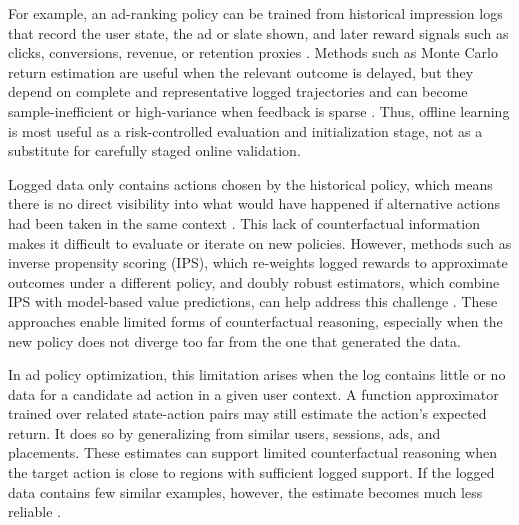 \documentclass[manuscript,review,screen]{acmart}
\begin{document}
For example, an ad-ranking policy can be trained from historical impression logs that record the user state, the ad or slate shown, and later reward signals such as clicks, conversions, revenue, or retention proxies \cite{chen2022off, zhao2021dear, swaminathan2015counterfactual}. Methods such as Monte Carlo return estimation are useful when the relevant outcome is delayed, but they depend on complete and representative logged trajectories and can become sample-inefficient or high-variance when feedback is sparse \cite{Sutton1998, levine2020offline, dulac2021challenges}. Thus, offline learning is most useful as a risk-controlled evaluation and initialization stage, not as a substitute for carefully staged online validation.

Logged data only contains actions chosen by the historical policy, which means there is no direct visibility into what would have happened if alternative actions had been taken in the same context \cite{swaminathan2015counterfactual}. This lack of counterfactual information makes it difficult to evaluate or iterate on new policies. However, methods such as inverse propensity scoring (IPS), which re-weights logged rewards to approximate outcomes under a different policy, and doubly robust estimators, which combine IPS with model-based value predictions, can help address this challenge \cite{swaminathan2015counterfactual, dudik2011doubly, levine2020offline}. These approaches enable limited forms of counterfactual reasoning, especially when the new policy does not diverge too far from the one that generated the data.

 In ad policy optimization, this limitation arises when the log contains little or no data for a candidate ad action in a given user context. A function approximator trained over related state-action pairs may still estimate the action's expected return. It does so by generalizing from similar users, sessions, ads, and placements. These estimates can support limited counterfactual reasoning when the target action is close to regions with sufficient logged support. If the logged data contains few similar examples, however, the estimate becomes much less reliable \cite{levine2020offline, swaminathan2015counterfactual}.
\end{document}

